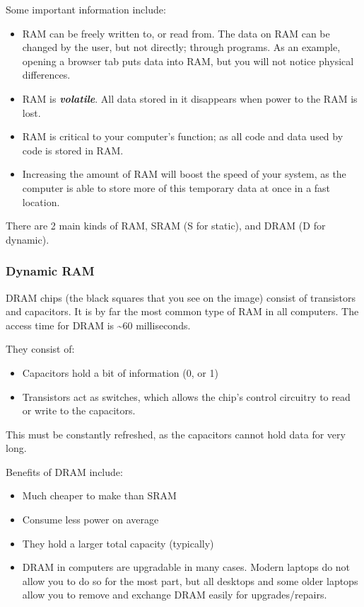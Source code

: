 \documentclass[../main.tex]{subfiles}
\begin{document}
Some important information include:

\begin{itemize}
    \item RAM can be freely written to, or read from. The data on RAM can be changed by the user, but not directly; through programs. As an example, opening a browser tab puts data into RAM, but you will not notice physical differences.
    \item RAM is \textbf{\emph{volatile}}. All data stored in it disappears when power to the RAM is lost.
    \item RAM is critical to your computer's function; as all code and data used by code is stored in RAM.
    \item Increasing the amount of RAM will boost the speed of your system, as the computer is able to store more of this temporary data at once in a fast location.
\end{itemize}

There are 2 main kinds of RAM, SRAM (S for static), and DRAM (D for dynamic).

\subsubsection{Dynamic RAM}

DRAM chips (the black squares that you see on the image) consist of transistors and capacitors. It is by far the most common type of RAM in all computers. The access time for DRAM is \textasciitilde60 milliseconds.

They consist of:

\begin{itemize}
    \item Capacitors hold a bit of information (0, or 1)
    \item Transistors act as switches, which allows the chip's control circuitry to read or write to the capacitors.
\end{itemize}

This must be constantly refreshed, as the capacitors cannot hold data for very long.

Benefits of DRAM include:

\begin{itemize}
    \item Much cheaper to make than SRAM
    \item Consume less power on average
    \item They hold a larger total capacity (typically)
    \item DRAM in computers are upgradable in many cases. Modern laptops do not allow you to do so for the most part, but all desktops and some older laptops allow you to remove and exchange DRAM easily for upgrades/repairs.
\end{itemize}
\end{document}
